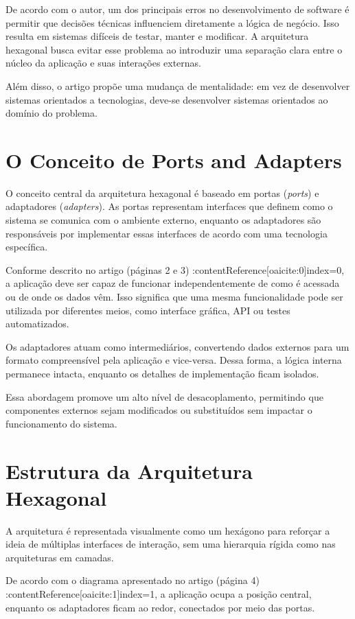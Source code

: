 \documentclass[conference]{IEEEtran}
\begin{document}
De acordo com o autor, um dos principais erros no desenvolvimento de software é permitir que decisões técnicas influenciem diretamente a lógica de negócio. Isso resulta em sistemas difíceis de testar, manter e modificar. A arquitetura hexagonal busca evitar esse problema ao introduzir uma separação clara entre o núcleo da aplicação e suas interações externas.

Além disso, o artigo propõe uma mudança de mentalidade: em vez de desenvolver sistemas orientados a tecnologias, deve-se desenvolver sistemas orientados ao domínio do problema.

\section{O Conceito de Ports and Adapters}

O conceito central da arquitetura hexagonal é baseado em portas (\textit{ports}) e adaptadores (\textit{adapters}). As portas representam interfaces que definem como o sistema se comunica com o ambiente externo, enquanto os adaptadores são responsáveis por implementar essas interfaces de acordo com uma tecnologia específica.

Conforme descrito no artigo (páginas 2 e 3) :contentReference[oaicite:0]{index=0}, a aplicação deve ser capaz de funcionar independentemente de como é acessada ou de onde os dados vêm. Isso significa que uma mesma funcionalidade pode ser utilizada por diferentes meios, como interface gráfica, API ou testes automatizados.

Os adaptadores atuam como intermediários, convertendo dados externos para um formato compreensível pela aplicação e vice-versa. Dessa forma, a lógica interna permanece intacta, enquanto os detalhes de implementação ficam isolados.

Essa abordagem promove um alto nível de desacoplamento, permitindo que componentes externos sejam modificados ou substituídos sem impactar o funcionamento do sistema.

\section{Estrutura da Arquitetura Hexagonal}

A arquitetura é representada visualmente como um hexágono para reforçar a ideia de múltiplas interfaces de interação, sem uma hierarquia rígida como nas arquiteturas em camadas.

De acordo com o diagrama apresentado no artigo (página 4) :contentReference[oaicite:1]{index=1}, a aplicação ocupa a posição central, enquanto os adaptadores ficam ao redor, conectados por meio das portas.
\end{document}
